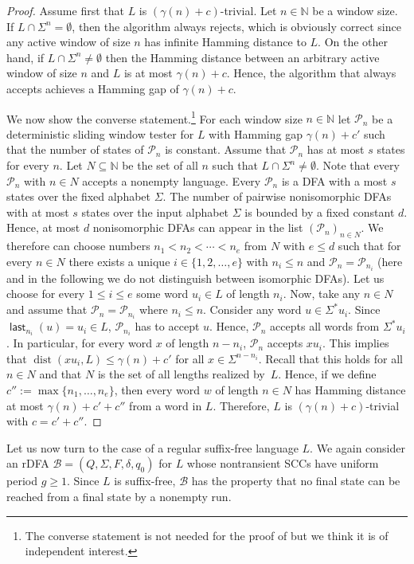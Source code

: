 \documentclass{article}\usepackage[a4paper,margin=20mm]{geometry}
\newcommand{\N}{\mathbb{N}}
\newcommand{\B}{\mathcal{B}}
\renewcommand{\P}{\mathcal{P}}
\DeclareMathOperator{\last}{\mathsf{last}}
\DeclareMathOperator{\dist}{dist}
\renewcommand{\geq}{\geqslant}
\renewcommand{\leq}{\leqslant}
\renewcommand{\ge}{\geq}
\renewcommand{\le}{\leq}
\begin{document}
\begin{proof}
Assume first that $L$ is $(\gamma(n)+c)$-trivial. Let $n \in \N$ be a window size.
If $L\cap \Sigma^n=\emptyset$, then the algorithm always rejects,
which is obviously correct since any active window of size $n$ has infinite Hamming distance to $L$. 
On the other hand, if $L\cap \Sigma^n \neq \emptyset$ then the Hamming distance between an arbitrary active window
of size $n$ and $L$ is at most $\gamma(n)+c$. Hence, the algorithm that always accepts achieves
a Hamming gap of $\gamma(n)+c$.

We now show the converse statement.\footnote{The converse statement is not needed for the proof of  
but we think it is of independent interest.}
For each window size $n \in \N$ let $\P_n$ be a deterministic sliding window tester for $L$
with Hamming gap $\gamma(n)+c'$ such that the number of states of $\P_n$ is constant.
Assume that $\P_n$ has at most $s$ states for every $n$.
Let $N \subseteq \N$ be the set of all $n$ such that $L \cap \Sigma^n \neq \emptyset$.
Note that every $\P_n$ with $n \in N$ accepts a nonempty language.
Every $\P_n$ is a DFA with a most $s$ states over the fixed alphabet $\Sigma$.
The number of pairwise nonisomorphic DFAs with at most $s$ states
over the input alphabet $\Sigma$ is bounded by a fixed constant $d$.
Hence, at most $d$ nonisomorphic DFAs can appear in the list $(\P_n)_{n \in N}$.
We therefore can choose 
numbers $n_1 < n_2 < \cdots < n_e$ from $N$ with $e \leq d$ such that
for every $n \in N$ there exists a unique $i \in \{1,2,\ldots,e\}$ with $n _i \le n$ and $\P_n = \P_{n_i}$
(here and in the following we do not distinguish between isomorphic DFAs).
Let us choose for every $1 \le i \le e$ some word $u_i \in L$ of length $n_i$.
Now, take any $n \in N$ and assume that $\P_n = \P_{n_i}$ where $n_i \leq n$.
Consider any word $u \in \Sigma^* u_i$.
Since $\last_{n_i}(u) = u_i \in L$, $\P_{n_i}$ has to accept $u$.
Hence, $\P_n$ accepts all words from $\Sigma^* u_i$.
In particular, for every word $x$ of length $n-n_i$, $\P_n$ accepts $xu_i$.
This implies that $\dist(x u_i,L) \leq \gamma(n)+c'$ for all $x \in \Sigma^{n-n_i}$.
Recall that this holds for all $n \in N$ and that $N$ is the set of all lengths realized by~$L$.
Hence, if we define $c'' := \max\{n_1, \ldots, n_e\}$,
then every word $w$ of length $n \in N$ has Hamming distance at most $\gamma(n)+c'+c''$ from a word in $L$.
Therefore, $L$ is $(\gamma(n)+c)$-trivial with $c=c'+c''$. 
\end{proof}
Let us now turn to the case of a regular suffix-free language $L$.
We again consider an rDFA $\B = (Q,\Sigma,F,\delta,q_0)$
for $L$ whose nontransient SCCs have uniform period $g \ge 1$.
Since $L$ is suffix-free, $\B$ has the property that no final state can be reached from a
final state by a nonempty run.
\end{document}
